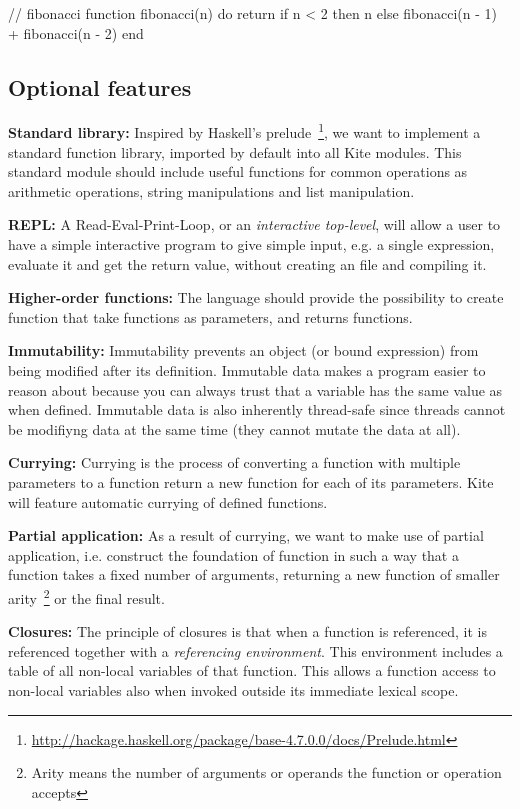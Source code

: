 \begin{pseudo}
// fibonacci
function fibonacci(n) do
  return if n < 2
    then n
    else fibonacci(n - 1) + fibonacci(n - 2)
end
\end{pseudo}


\subsection{Optional features}

\textbf{Standard library:}
Inspired by Haskell's prelude~\footnote{\url{http://hackage.haskell.org/package/base-4.7.0.0/docs/Prelude.html}}, we want to implement a standard function library, imported by default into all Kite modules. This standard module should include useful functions for common operations as arithmetic operations, string manipulations and list manipulation.

\textbf{REPL:}
A Read-Eval-Print-Loop, or an \emph{interactive top-level}, will allow a user to have a simple interactive program to give simple input, e.g. a single expression, evaluate it and get the return value, without creating an file and compiling it.

\textbf{Higher-order functions:}
The language should provide the possibility to create function that take functions as parameters, and returns functions.

\textbf{Immutability:}
Immutability prevents an object (or bound expression) from being modified after its definition. Immutable data makes a program easier to reason about because you can always trust that a variable has the same value as when defined. Immutable data is also inherently thread-safe\cite[sec. 3.4]{goetz et al.} since threads cannot be modifiyng data at the same time (they cannot mutate the data at all).

\textbf{Currying:}
Currying is the process of converting a function with multiple parameters to a function return a new function for each of its parameters. Kite will feature automatic currying of defined functions.

\textbf{Partial application:}
As a result of currying, we want to make use of partial application, i.e. construct the foundation of function in such a way that a function takes a fixed number of arguments, returning a new function of smaller arity~\footnote{Arity means the number of arguments or operands the function or operation accepts} or the final result.

\textbf{Closures:}
The principle of closures is that when a function is referenced, it is referenced together with a \emph{referencing environment}. This environment includes a table of all non-local variables of that function. This allows a function access to non-local  variables also when invoked outside its immediate lexical scope.

